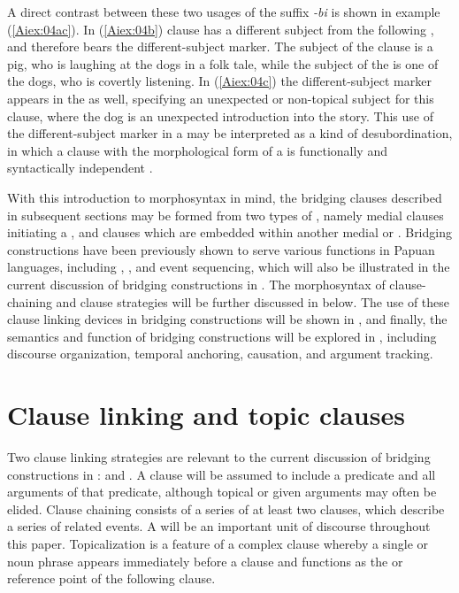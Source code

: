 \documentclass[output=paper]{LSP/langsci}
\begin{document}
A direct contrast between these two usages of the suffix \textit{-bi} is shown in example (\ref{Aiex:04ac}). In (\ref{Aiex:04b})  clause has a different subject from the following , and therefore bears the different-subject marker. The subject of the  clause is a pig, who is laughing at the dogs in a folk tale, while the subject of the  is one of the dogs, who is covertly listening. In (\ref{Aiex:04c}) the different-subject marker appears in the  as well, specifying an unexpected or non-topical subject for this clause, where the dog is an unexpected introduction into the story. This use of the different-subject marker in a  may be interpreted as a kind of desubordination, in which a clause with the morphological form of a  is functionally and syntactically independent \citep{evans07}.

With this introduction to  morphosyntax in mind, the bridging clauses described in
subsequent sections may be formed from two types of , namely medial clauses
initiating a , and  clauses which are embedded within another medial or .
Bridging constructions have been previously shown to
serve various functions in Papuan languages, including , , and
event sequencing, which will also be illustrated in the current discussion of bridging constructions in
. The morphosyntax of clause-chaining and clause  strategies will be further
discussed in  below. The use of these clause linking devices in bridging constructions will be shown in
, and finally, the semantics and function of bridging constructions will be explored in , including
discourse organization, temporal anchoring, causation, and argument tracking.

\section{Clause linking and topic clauses} 
\label{Ailinkingtopic}
Two clause linking strategies are relevant to the current discussion of bridging constructions in
:  and . A clause will be assumed to include a predicate and all
arguments of that predicate, although topical or given arguments may often be elided. Clause chaining
consists of a series of at least two clauses, which describe a series of related
events. A  will be an important unit of  discourse throughout this paper. Topicalization
is a feature of a complex clause whereby a single  or noun phrase appears immediately
before a clause and functions as the  or reference point of the following clause.
\end{document}
